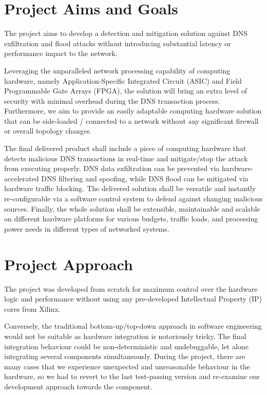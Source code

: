 \documentclass[a4paper]{report}
\begin{document}
\section{Project Aims and Goals}

The project aims to develop a detection and mitigation solution against DNS exfiltration and flood attacks without introducing substantial latency or performance impact to the network.

Leveraging the unparalleled network processing capability of computing hardware, namely Application-Specific Integrated Circuit (ASIC) and Field Programmable Gate Arrays (FPGA), the solution will bring an extra level of security with minimal overhead during the DNS transaction process. Furthermore, we aim to provide an easily adaptable computing hardware solution that can be side-loaded / connected to a network without any significant firewall or overall topology changes.

The final delivered product shall include a piece of computing hardware that detects malicious DNS transactions in real-time and mitigate/stop the attack from executing properly. DNS data exfiltration can be prevented via hardware-accelerated DNS filtering and spoofing, while DNS flood can be mitigated via hardware traffic blocking. The delivered solution shall be versatile and instantly re-configurable via a software control system to defend against changing malicious sources. Finally, the whole solution shall be extensible, maintainable and scalable on different hardware platforms for various budgets, traffic loads, and processing power needs in different types of networked systems.

\section{Project Approach}

The project was developed from scratch for maximum control over the hardware logic and performance without using any pre-developed Intellectual Property (IP) cores from Xilinx.

Conversely, the traditional bottom-up/top-down approach in software engineering would not be suitable as hardware integration is notoriously tricky. The final integration behaviour could be non-deterministic and undebuggable, let alone integrating several components simultaneously. During the project, there are many cases that we experience unexpected and unreasonable behaviour in the hardware, so we had to revert to the last test-passing version and re-examine our development approach towards the component.
\end{document}

